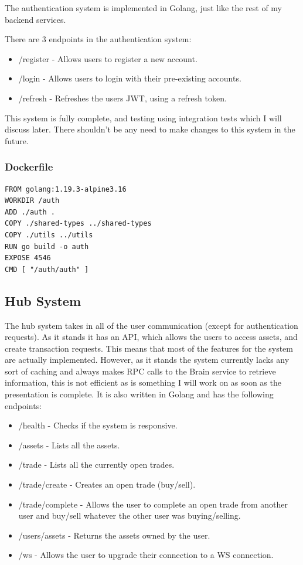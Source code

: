 \documentclass[titlepage]{article}
\begin{document}
The authentication system is implemented in Golang, just like the rest of my backend services.

There are 3 endpoints in the authentication system:
\begin{itemize}
  \item /register - Allows users to register a new account.
  \item /login - Allows users to login with their pre-existing accounts.
  \item /refresh - Refreshes the users JWT, using a refresh token.
\end{itemize}

This system is fully complete, and testing using integration tests which I will discuss later. There shouldn't be any need to make changes to this system in the future.

\subsubsection{Dockerfile}
\begin{verbatim}
FROM golang:1.19.3-alpine3.16
WORKDIR /auth
ADD ./auth .
COPY ./shared-types ../shared-types
COPY ./utils ../utils
RUN go build -o auth
EXPOSE 4546
CMD [ "/auth/auth" ]
\end{verbatim}

\subsection{Hub System}
The hub system takes in all of the user communication (except for authentication requests). As it stands it has an API, which allows the users to access assets, and create transaction requests. This means that most of the features for the system are actually implemented. However, as it stands the system currently lacks any sort of caching and always makes RPC calls to the Brain service to retrieve information, this is not efficient as is something I will work on as soon as the presentation is complete. It is also written in Golang and has the following endpoints:

\begin{itemize}
  \item /health - Checks if the system is responsive.
  \item /assets - Lists all the assets.
  \item /trade - Lists all the currently open trades.
  \item /trade/create - Creates an open trade (buy/sell).
  \item /trade/complete - Allows the user to complete an open trade from another user and buy/sell whatever the other user was buying/selling.
  \item /users/assets - Returns the assets owned by the user.
  \item /ws - Allows the user to upgrade their connection to a WS connection.
\end{itemize}
\end{document}
